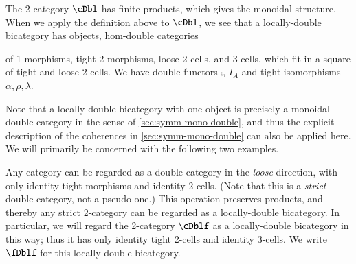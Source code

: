The 2-category $\cDbl$ has finite products, which gives the monoidal structure. 
When we apply the definition above to $\cDbl$, we see that a locally-double bicategory has objects, hom-double categories {of 1-morphisms, tight 2-morphisms, loose 2-cells, and 3-cells, which fit in a square of tight and loose 2-cells. We have double functors $\comp$, $I_A$ and tight isomorphisms $\alpha, \rho, \lambda$.

Note that a locally-double bicategory with one object is precisely a monoidal double category in the sense of \cref{sec:symm-mono-double}, and thus the explicit description of the coherences in \cref{sec:symm-mono-double} can also be applied here.
We will primarily be concerned with the following two examples.

\begin{eg}
  Any category can be regarded as a double category in the \emph{loose} direction, with only identity tight morphisms and identity 2-cells.
  (Note that this is a \emph{strict} double category, not a pseudo one.)
  This operation preserves products, and thereby any strict 2-category can be regarded as a locally-double bicategory.
  In particular, we will regard the 2-category $\cDblf$ as a locally-double bicategory in this way; thus it has only identity tight 2-cells and identity 3-cells. We write $\fDblf$ for this locally-double bicategory.
\end{eg}

}

